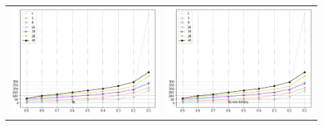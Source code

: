 \documentclass{article}
\begin{document}
\begin{table}[h!]
\begin{tabular}{p{0.45\linewidth}p{0.45\linewidth}}
            \includegraphics[width=\linewidth]{fp} & \includegraphics[width=\linewidth]{fp_non_binary}\\ 
        \end{tabular}
    \end{table}
    \newpage
\end{document}
